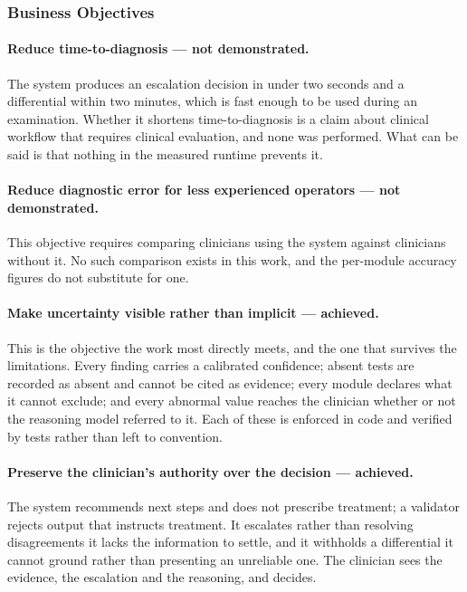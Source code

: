 \subsubsection{Business Objectives}

\paragraph{Reduce time-to-diagnosis --- not demonstrated.} The system produces an escalation
decision in under two seconds and a differential within two minutes, which is fast enough to be
used during an examination. Whether it shortens time-to-diagnosis is a claim about clinical
workflow that requires clinical evaluation, and none was performed. What can be said is that
nothing in the measured runtime prevents it.

\paragraph{Reduce diagnostic error for less experienced operators --- not demonstrated.} This
objective requires comparing clinicians using the system against clinicians without it. No such
comparison exists in this work, and the per-module accuracy figures do not substitute for one.

\paragraph{Make uncertainty visible rather than implicit --- achieved.} This is the objective
the work most directly meets, and the one that survives the limitations. Every finding carries a
calibrated confidence; absent tests are recorded as absent and cannot be cited as evidence;
every module declares what it cannot exclude; and every abnormal value reaches the clinician
whether or not the reasoning model referred to it. Each of these is enforced in code and
verified by tests rather than left to convention.

\paragraph{Preserve the clinician's authority over the decision --- achieved.} The system
recommends next steps and does not prescribe treatment; a validator rejects output that
instructs treatment. It escalates rather than resolving disagreements it lacks the information
to settle, and it withholds a differential it cannot ground rather than presenting an unreliable
one. The clinician sees the evidence, the escalation and the reasoning, and decides.

